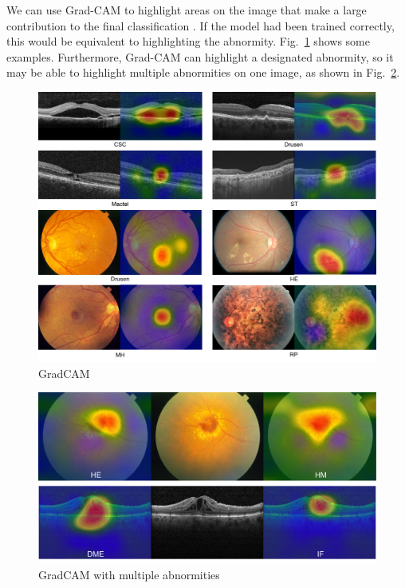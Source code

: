 \documentclass{article}
\begin{document}
	We can use Grad-CAM to highlight areas on the image that make a large contribution to the final classification \autocite{Selvaraju_Cogswell_Das_Vedantam_Parikh_Batra}. If the model had been trained correctly, this would be equivalent to highlighting the abnormity. Fig.~\ref{fig:gradCAM} shows some examples. Furthermore, Grad-CAM can highlight a designated abnormity, so it may be able to highlight multiple abnormities on one image, as shown in Fig.~\ref{fig:gradCAM_multi_abnormity}. 
	
	\begin{figure}[htbp]
		\centering
		\includegraphics[width=\linewidth]{Figs/abnormity_gradCAM.pdf}
		\caption{GradCAM}
		\vspace{0.3cm}
		\label{fig:gradCAM}
	\end{figure}
	
	\begin{figure}[htbp]
		\centering
		\includegraphics[width=0.8\linewidth]{Figs/abnormity_gradCAM_multiple_abnormities.pdf}
		\caption{GradCAM with multiple abnormities}
		\vspace{0.3cm}
		\label{fig:gradCAM_multi_abnormity}
	\end{figure}
	
\end{document}
